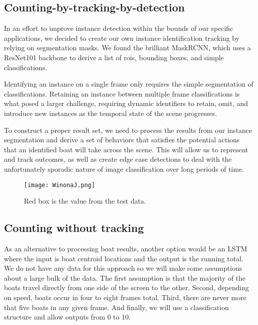 \documentclass[10pt,twocolumn,letterpaper]{article}
\begin{document}
\subsection{Counting-by-tracking-by-detection}

In an effort to improve instance detection within the bounds of our specific applications, we decided to create our own instance identification tracking by relying on segmentation masks.  We found the brilliant MaskRCNN, which uses a ResNet101 backbone to derive a list of rois, bounding boxes, and simple classifications.

Identifying an instance on a single frame only requires the simple  segmentation of classifications.  Retaining an instance between multiple frame classifications is what posed a larger challenge, requiring dynamic identifiers to retain, omit, and introduce new instances as the temporal state of the scene progresses.  

To construct a proper result set, we need to process the results from our instance segmentation and derive a set of behaviors that satisfies the potential actions that an identified boat will take across the scene.  This will allow us to represent and track outcomes, as well as create edge case detections to deal with the unfortunately sporadic nature of image classification over long periods of time.


\begin{figure*}[t]
  \centering
    \texttt{[image: WinonaJ.png]}
    \caption{Red box is the value from the test data.}
    \label{fig:WinonaJ}
  \hfill
\end{figure*}


\subsection{Counting without tracking}

As an alternative to processing boat results, another option would be an LSTM where the input is boat centroid locations and the output is the running total. We do not have any data for this approach so we will make some assumptions about a large bulk of the data. The first assumption is that the majority of the boats travel directly from one side of the screen to the other. Second, depending on speed, boats occur in four to eight frames total. Third, there are never more that five boats in any given frame. And finally, we will use a classification structure and allow outputs from 0 to 10. 
\end{document}
